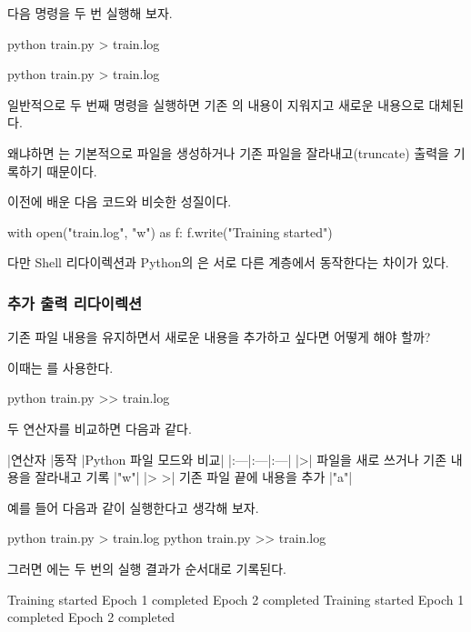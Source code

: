 다음 명령을 두 번 실행해 보자.

\begin{dhkzsh}
python train.py > train.log
\end{dhkzsh}

\begin{dhkzsh}
python train.py > train.log
\end{dhkzsh}

일반적으로 두 번째 명령을 실행하면 기존 의 내용이 지워지고 새로운 내용으로 대체된다.

왜냐하면 \zsh{>}는 기본적으로 파일을 생성하거나 기존 파일을 잘라내고(truncate) 출력을 기록하기 때문이다.

이전에 배운 다음 코드와 비슷한 성질이다.

\begin{dhkcode}
with open("train.log", "w") as f:
    f.write("Training started\n")
\end{dhkcode}

다만 Shell 리다이렉션과 Python의 은 서로 다른 계층에서 동작한다는 차이가 있다.

\subsubsection{추가 출력 리다이렉션 \zsh{>>}}

기존 파일 내용을 유지하면서 새로운 내용을 추가하고 싶다면 어떻게 해야 할까?

이때는 \zsh{>>}를 사용한다.

\begin{dhkzsh}
python train.py >> train.log
\end{dhkzsh}

두 연산자를 비교하면 다음과 같다.

\begin{dhktable}
|연산자	|동작	|Python 파일 모드와 비교|
|:---|:---|:---|
|>|	파일을 새로 쓰거나 기존 내용을 잘라내고 기록	|"w"|
|> >|	기존 파일 끝에 내용을 추가	|"a"|
\end{dhktable}

예를 들어 다음과 같이 실행한다고 생각해 보자.

\begin{dhkzsh}
python train.py > train.log
python train.py >> train.log
\end{dhkzsh}

그러면 에는 두 번의 실행 결과가 순서대로 기록된다.

\begin{dhkzsh}
Training started
Epoch 1 completed
Epoch 2 completed
Training started
Epoch 1 completed
Epoch 2 completed
\end{dhkzsh}

